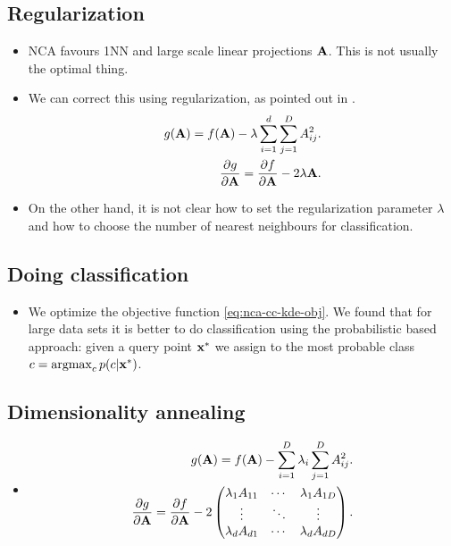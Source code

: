 \subsection{Regularization}
\label{subsec:regularization}

\begin{itemize}
    \item NCA favours 1NN and large scale linear projections
        $\mathbf{A}$. This is not usually the optimal thing.
    \item We can correct this using regularization, as pointed
        out in \citep{singh2010}.
        \begin{align}
            g(\mathbf{A}) = f(\mathbf{A}) - \lambda \sum_{i=1}^d\sum_{j=1}^D A_{ij}^2.\\
            \frac{\partial g}{\partial \mathbf{A}} = \frac{\partial f}{\partial \mathbf{A}} -
2\lambda\mathbf{A}.
        \end{align}
    \item On the other hand, it is not clear how to set the
        regularization parameter $\lambda$ and how to choose
        the number of nearest neighbours for classification.
\end{itemize}

\subsection{Doing classification}
\label{subsec:doing-classification}

\begin{itemize}
    \item We optimize the objective function
        \ref{eq:nca-cc-kde-obj}. We found that for large data
        sets it is better to do classification using the
        probabilistic based approach: given a query point
        $\mathbf{x}^*$ we assign to the most probable class $c =
        \operatorname{argmax}_cp(c|\mathbf{x}^*)$.
\end{itemize}

\subsection{Dimensionality annealing}
\label{subsec:dimensionality-annealing}

\begin{itemize}
    \item
    \begin{align}
            g(\mathbf{A}) = f(\mathbf{A}) - \sum_{i=1}^D\lambda_i\sum_{j=1}^D A_{ij}^2.\\
            \frac{\partial g}{\partial \mathbf{A}} = \frac{\partial f}{\partial \mathbf{A}} - 2\begin{pmatrix}
                              \lambda_1A_{11} &  \cdots & \lambda_1A_{1D} \\
                              \vdots  &   \ddots & \vdots  \\
                              \lambda_dA_{d1} & \cdots & \lambda_dA_{dD}
                             \end{pmatrix}.
        \end{align}
\end{itemize}
